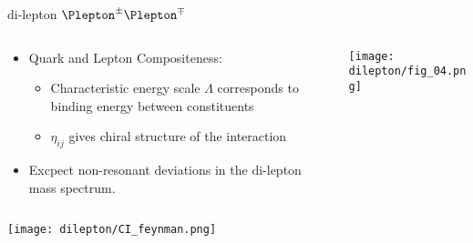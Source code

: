 \documentclass[8pt]{beamer}
\begin{document}
\begin{frame}{\large di-lepton $\Plepton^{\pm}\Plepton^{\mp}$}

\begin{columns}
  \begin{column}{5cm}
  
  \begin{itemize}
    \item Quark and Lepton Compositeness:
    \begin{itemize}
      \item Characteristic energy scale $\varLambda$ corresponds to binding energy between constituents
      \item $\eta_{ij}$ gives chiral structure of the interaction
    \end{itemize}
    \item Excpect non-resonant deviations in the di-lepton mass spectrum.
  \end{itemize}
  \end{column}
  \begin{column}{7cm}
  \texttt{[image: dilepton/fig\_04.png]}\\
  
  \end{column}
\end{columns}

{\centering
  \texttt{[image: dilepton/CI\_feynman.png]}\\
}

\end{frame}
\end{document}
